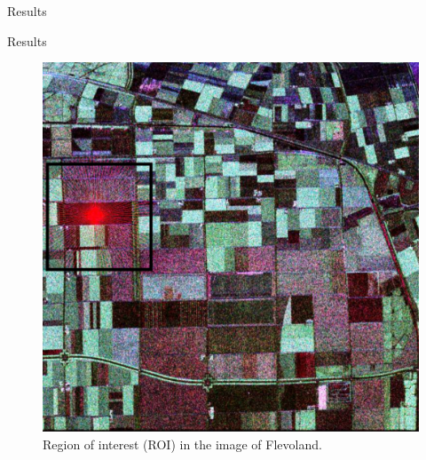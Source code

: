 \documentclass[10pt]{beamer}
\begin{document}
\begin{frame}[fragile]{Results}
\begin{alertblock}{Results}
	\begin{figure}[hbt]
\centering
	\includegraphics[width=.5\linewidth]{flevoland_radial_4_look_black}
	\caption{Region of interest (ROI) in the image of Flevoland.}
\label{fig10}
\end{figure}
\end{alertblock}
\end{frame}
\end{document}

